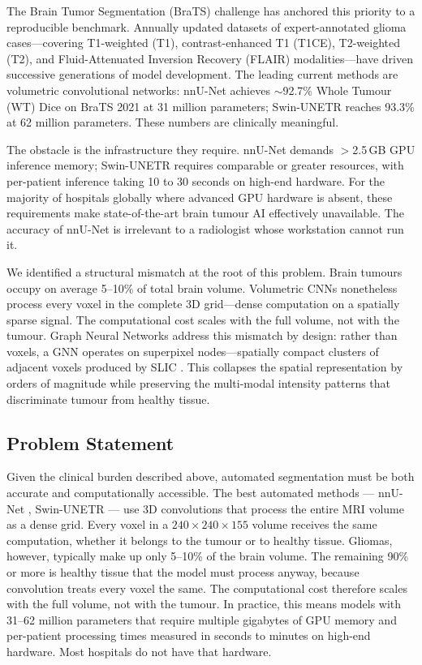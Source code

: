\documentclass{article}
\begin{document}
The Brain Tumor Segmentation (BraTS) challenge \cite{menze2015multimodal, bakas2021brats}
has anchored this priority to a reproducible benchmark. Annually updated datasets of
expert-annotated glioma cases---covering T1-weighted (T1), contrast-enhanced T1
(T1CE), T2-weighted (T2), and Fluid-Attenuated Inversion Recovery (FLAIR)
modalities---have driven successive generations of model development. The leading
current methods are volumetric convolutional networks: nnU-Net
\cite{isensee2021nnunet} achieves $\sim$92.7\% Whole Tumour (WT) Dice on BraTS 2021
at 31 million parameters; Swin-UNETR \cite{hatamizadeh2022swin} reaches 93.3\% at 62
million parameters. These numbers are clinically meaningful.

The obstacle is the infrastructure they require. nnU-Net demands $>$2.5\,GB GPU
inference memory; Swin-UNETR requires comparable or greater resources, with
per-patient inference taking 10 to 30 seconds on high-end hardware. For the majority
of hospitals globally where advanced GPU hardware is absent, these requirements make
state-of-the-art brain tumour AI effectively unavailable. The accuracy of nnU-Net
is irrelevant to a radiologist whose workstation cannot run it.

We identified a structural mismatch at the root of this problem. Brain tumours occupy
on average 5--10\% of total brain volume. Volumetric CNNs nonetheless process every
voxel in the complete 3D grid---dense computation on a spatially sparse signal. The
computational cost scales with the full volume, not with the tumour. Graph Neural
Networks \cite{hamilton2017graphsage} address this mismatch by design: rather than
voxels, a GNN operates on superpixel nodes---spatially compact clusters of adjacent
voxels produced by SLIC \cite{achanta2012slic}. This collapses the spatial
representation by orders of magnitude while preserving the multi-modal intensity
patterns that discriminate tumour from healthy tissue.

\subsection{Problem Statement}
\label{sec:problem}

Given the clinical burden described above, automated segmentation must be both
accurate and computationally accessible. The best automated methods --- nnU-Net \cite{isensee2021nnunet}, Swin-UNETR
\cite{hatamizadeh2022swin} --- use 3D convolutions that process the entire MRI
volume as a dense grid. Every voxel in a $240 \times 240 \times 155$ volume
receives the same computation, whether it belongs to the tumour or to healthy
tissue. Gliomas, however, typically make up only 5--10\% of the brain volume.
The remaining 90\% or more is healthy tissue that the model must process anyway,
because convolution treats every voxel the same. The computational cost therefore
scales with the full volume, not with the tumour. In practice, this means models with 31--62 million parameters
\cite{isensee2021nnunet, hatamizadeh2022swin} that require multiple gigabytes
of GPU memory and per-patient processing times measured in seconds to minutes
on high-end hardware. Most hospitals do not have that hardware.
\end{document}
